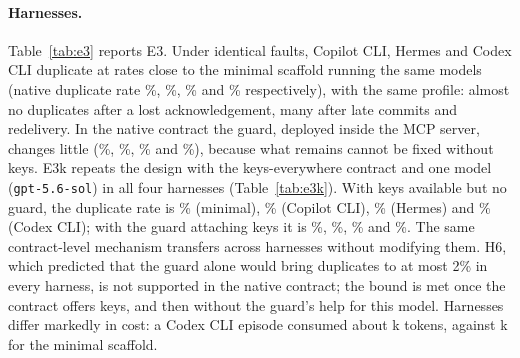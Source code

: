 \paragraph{Harnesses.} Table~\ref{tab:e3} reports E3. Under identical faults, Copilot CLI, Hermes and Codex CLI
duplicate at rates close to the minimal scaffold running the same models (native duplicate rate
\EThreeMinimalVanillaDSR{}\%, \EThreeCopilotVanillaDSR{}\%, \EThreeHermesVanillaDSR{}\% and
\EThreeCodexVanillaDSR{}\% respectively), with the same profile: almost no duplicates after a lost acknowledgement,
many after late commits and redelivery. In the native contract the guard, deployed inside the MCP server, changes
little (\EThreeMinimalGuardDSR{}\%, \EThreeCopilotGuardDSR{}\%, \EThreeHermesGuardDSR{}\% and
\EThreeCodexGuardDSR{}\%), because what remains cannot be fixed without keys. E3k repeats the design with the
keys-everywhere contract and one model (\texttt{gpt-5.6-sol}) in all four harnesses (Table~\ref{tab:e3k}). With keys
available but no guard, the duplicate rate is \EThreeKMinimalKeysVanillaDsr{}\% (minimal),
\EThreeKCopilotKeysVanillaDsr{}\% (Copilot CLI), \EThreeKHermesKeysVanillaDsr{}\% (Hermes) and
\EThreeKCodexKeysVanillaDsr{}\% (Codex CLI); with the guard attaching keys it is \EThreeKMinimalKeysGuardDsr{}\%,
\EThreeKCopilotKeysGuardDsr{}\%, \EThreeKHermesKeysGuardDsr{}\% and \EThreeKCodexKeysGuardDsr{}\%. The same
contract-level mechanism transfers across harnesses without modifying them. H6, which predicted that the guard alone
would bring duplicates to at most 2\% in every harness, is not supported in the native contract; the bound is met
once the contract offers keys, and then without the guard's help for this model. Harnesses differ markedly in cost: a
Codex CLI episode consumed about \EThreeCodexTokensK{}k tokens, against \EThreeMinimalTokensK{}k for the minimal
scaffold.

\begin{table}[t]
\centering
\scriptsize
\caption{Production harnesses (E3). Duplicate rates are for the native condition by fault family; EOS is over
faulted episodes, natively and with the guard deployed in the MCP server.}
\label{tab:e3}

\end{table}

\begin{table}[t]
\centering
\small
\caption{Duplicate rate (\%) under committed faults and redelivery for \texttt{gpt-5.6-sol} in each harness,
by contract variant and condition (E3 and E3k); the last column is exactly-once success with keys everywhere and
the guard.}
\label{tab:e3k}

\end{table}

